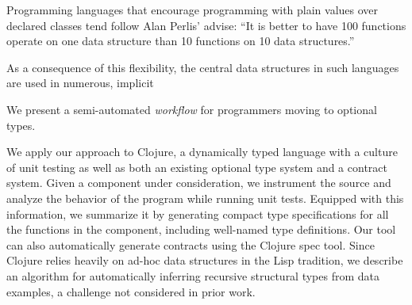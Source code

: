 %



Programming languages that encourage programming with plain values over declared classes
tend follow Alan Perlis' advise:
``It is better to have 100 functions operate on one data structure than 10 functions on 10 data structures.''

As a consequence of this flexibility, the central data structures in such languages
are used in numerous, implicit 

We present a semi-automated \emph{workflow} for programmers moving
to optional types.


We apply our approach to Clojure, a dynamically typed
language with a culture of unit testing as well as both an existing
optional type system and a contract system. Given a component under
consideration, we instrument the source and analyze the behavior of the
program while running unit tests.
Equipped with this information, we summarize it by generating compact
type specifications for all the functions in the component, including
well-named type definitions. Our tool can also automatically generate
contracts using the Clojure spec tool. Since Clojure relies
heavily on ad-hoc data structures in the Lisp tradition, we describe
an algorithm for automatically inferring recursive structural types
from data examples, a challenge not considered in prior work.

